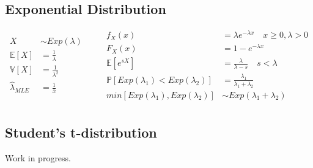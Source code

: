 \subsection{Exponential Distribution}
\begin{equation*}
    \begin{aligned}
        X &\sim Exp(\lambda) \qquad\\
        \mathbb{E}[X] &= \frac{1}{\lambda} \\
        \mathbb{V}[X] &= \frac{1}{\lambda^2} \\
        \hat{\lambda}_{MLE} &= \frac{1}{\bar{x}} \\
    \end{aligned}
    \begin{aligned}
        f_X(x) &= \lambda e^{-\lambda x} \quad x \ge 0, \lambda > 0 \\
        F_X(x) &= 1 - e^{-\lambda x} \\
        \mathbb{E}[e^{sX}] &= \frac{\lambda}{\lambda - s} \quad s < \lambda \\
        \mathbb{P}[Exp(\lambda_1) < Exp(\lambda_2)] &= \frac{\lambda_1}{\lambda_1 + \lambda_2}\\
        min[Exp(\lambda_1), Exp(\lambda_2)] &\sim Exp(\lambda_1 + \lambda_2) \\
    \end{aligned}
\end{equation*}

\subsection{Student's t-distribution}
Work in progress.
